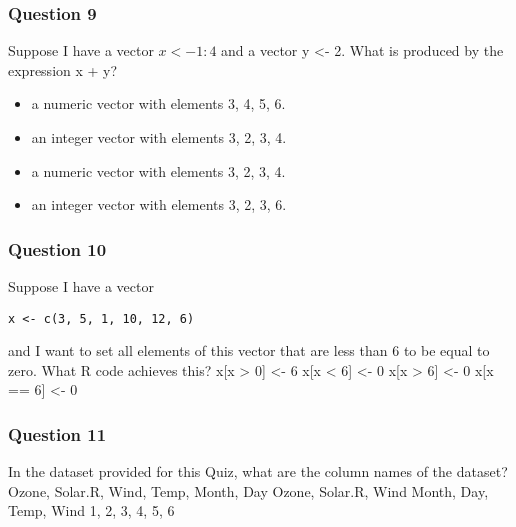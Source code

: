 \begin{frame}
\frametitle{Question 9}
\Large
Suppose I have a vector $x <- 1:4$ and a vector y <- 2. What is produced by the expression x + y?
\begin{itemize}
\item a numeric vector with elements 3, 4, 5, 6.
\item an integer vector with elements 3, 2, 3, 4.
\item a numeric vector with elements 3, 2, 3, 4.
\item an integer vector with elements 3, 2, 3, 6.
\end{itemize}
\end{frame}
\begin{frame}
\frametitle{Question 10}
\Large
Suppose I have a vector 
\begin{verbatim}
x <- c(3, 5, 1, 10, 12, 6) 
\end{verbatim}
and I want to set all elements of this vector that are less than 6 to be equal to zero. What R code achieves this?
x[x > 0] <- 6
x[x < 6] <- 0
x[x > 6] <- 0
x[x == 6] <- 0
\end{frame}
\begin{frame}
\frametitle{Question 11}
\Large
In the dataset provided for this Quiz, what are the column names of the dataset?
Ozone, Solar.R, Wind, Temp, Month, Day
Ozone, Solar.R, Wind
Month, Day, Temp, Wind
1, 2, 3, 4, 5, 6
\end{frame}
